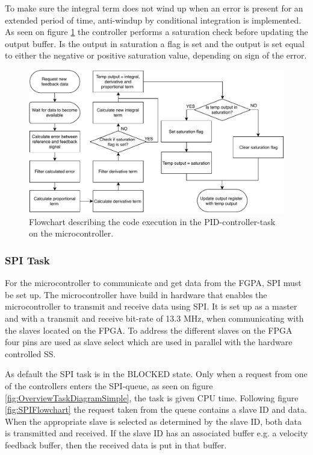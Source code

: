 \documentclass[../../main.tex]{subfiles}
\begin{document}
To make sure the integral term does not wind up when an error is present for an extended period of time, anti-windup by conditional integration is implemented. As seen on figure \ref{fig:PIDControllerFlowchart} the controller performs a saturation check before updating the output buffer. Is the output in saturation a flag is set and the output is set equal to either the negative or positive saturation value, depending on sign of the error. 


\begin{figure}[H]
    \centering
    \includegraphics[width=\textwidth]{Sections/System_Implementation/Images/PIDControllerFlowchart.pdf}
    \caption{Flowchart describing the code execution in the PID-controller-task on the microcontroller.}
    \label{fig:PIDControllerFlowchart}
\end{figure}





\subsubsection*{SPI Task}
For the microcontroller to communicate and get data from the FGPA, SPI must be set up.
The microcontroller have build in hardware that enables the microcontroller to transmit and receive data using SPI. It is set up as a master and with a transmit and receive bit-rate of 13.3 MHz, when communicating with the slaves located on the FPGA. 
To address the different slaves on the FPGA four pins are used as slave select which are used in parallel with the hardware controlled SS.

As default the SPI task is in the BLOCKED state. Only when a request from one of the controllers enters the SPI-queue, as seen on figure \ref{fig:OverviewTaskDiagramSimple}, the task is given CPU time. Following figure \ref{fig:SPIFlowchart} the request taken from the queue contains a slave ID and data. When the appropriate slave is selected as determined by the slave ID, both data is transmitted and received. If the slave ID has an associated buffer e.g. a velocity feedback buffer, then the received data is put in that buffer.  
\end{document}
